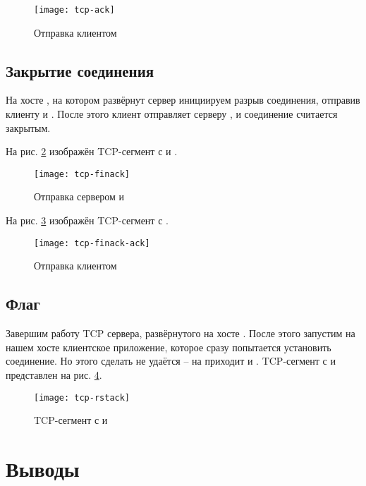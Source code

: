 \begin{figure}[H]
	\centering
	\texttt{[image: tcp-ack]}
	\caption{Отправка клиентом }
	\label{fig:tcp-ack}
\end{figure}

\subsection{Закрытие соединения}

На хосте , на котором развёрнут сервер инициируем разрыв соединения, отправив клиенту  и . После этого клиент отправляет серверу , и соединение считается закрытым.

На рис. \ref{fig:tcp-finack} изображён TCP-сегмент с  и .

\begin{figure}[H]
	\centering
	\texttt{[image: tcp-finack]}
	\caption{Отправка сервером  и }
	\label{fig:tcp-finack}
\end{figure}

На рис. \ref{fig:tcp-finack-ack} изображён TCP-сегмент с .

\begin{figure}[H]
	\centering
	\texttt{[image: tcp-finack-ack]}
	\caption{Отправка клиентом }
	\label{fig:tcp-finack-ack}
\end{figure}

\subsection{Флаг }

Завершим работу TCP сервера, развёрнутого на хосте . После этого запустим на нашем хосте клиентское приложение, которое сразу попытается установить соединение. Но этого сделать не удаётся -- на  приходит  и . TCP-сегмент с  и  представлен на рис. \ref{fig:tcp-rstack}.

\begin{figure}[H]
	\centering
	\texttt{[image: tcp-rstack]}
	\caption{TCP-сегмент с  и }
	\label{fig:tcp-rstack}
\end{figure}

\section{Выводы}

